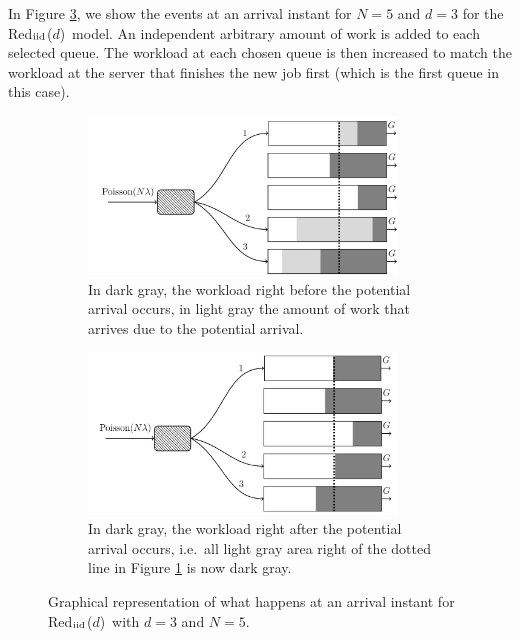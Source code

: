 \documentclass[12pt]{report}
\newcommand{\Redind}{Red$_{\textup{iid}}$($d$)}
\begin{document}
In Figure \ref{fig:redind_prentje}, we show the events at an arrival instant for $N=5$ and $d=3$ for the \Redind\ model. An independent arbitrary amount of work is added to each selected queue. The workload at each chosen queue is then increased to match the workload at the server that finishes the new job first (which is the first queue in this case).

\begin{figure}[t]
\begin{subfigure}{.45\textwidth}
\begin{center}
\captionsetup{width=.8\linewidth}
\includegraphics[width=0.9\textwidth]{figures/Chapter3/redind1.JPG}
\caption{In dark gray, the workload right before the potential arrival occurs, in light gray the amount of work that arrives due to the potential arrival.}
\label{fig:redind_prentje1}
\end{center}
\end{subfigure}
\begin{subfigure}{.45\textwidth}
\begin{center}
\captionsetup{width=.8\linewidth}
\includegraphics[width=0.9\textwidth]{figures/Chapter3/redind2.JPG}
\caption{In dark gray, the workload right after the potential arrival occurs, i.e.~all light gray area right of the dotted line in Figure \ref{fig:redind_prentje1} is now dark gray.}
\label{fig:redind_prentje2}
\end{center}
\end{subfigure}
\caption{Graphical representation of what happens at an arrival instant for \Redind\ with $d=3$ and $N=5$.}
\label{fig:redind_prentje}
\end{figure}
\end{document}
